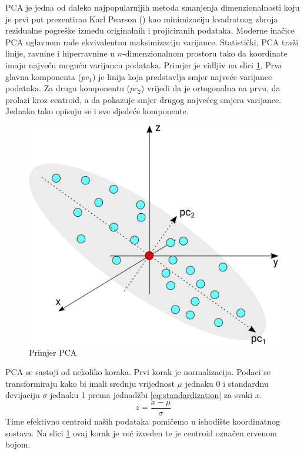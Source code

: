 \documentclass[times, utf8, diplomski]{fer}
\begin{document}
PCA je jedna od daleko najpopularnijih metoda smanjenja dimenzionalnosti koju je prvi put prezentirao Karl Pearson (\citeyear{pearson1901liii}) kao minimizaciju kvadratnog zbroja rezidualne pogreške između originalnih i projiciranih podataka. Moderne inačice PCA uglavnom rade ekvivalentnu maksimizaciju varijance. Statistički, PCA traži linije, ravnine i hiperravnine u $n$-dimenzionalnom prostoru tako da koordinate imaju najveću moguću varijancu podataka. Primjer je vidljiv na slici \ref{fig:pca}. Prva glavna komponenta ($pc_1$) je linija koja predstavlja smjer najveće varijance podataka. Za drugu komponentu ($pc_2$) vrijedi da je ortogonalna na prvu, da prolazi kroz centroid, a da pokazuje smjer drugog najvećeg smjera varijance. Jednako tako opisuju se i sve sljedeće komponente.
\begin{figure}[htb]
    \centering
    \includegraphics{resources/images/reduction/pca.png}
    \caption{Primjer PCA}
    \label{fig:pca}
\end{figure}

PCA se sastoji od nekoliko koraka.
Prvi korak je normalizacija. Podaci se transformiraju kako bi imali srednju vrijednost $\mu$ jednaku 0 i standardnu devijaciju $\sigma$ jednaku 1 prema jednadžbi \ref{eq:standardization} za svaki \(x\).
\begin{equation}
    z = \frac{x - \mu}{\sigma}
    \label{eq:standardization}
\end{equation}
Time efektivno centroid naših podataka pomičemo u ishodište koordinatnog sustava. Na slici \ref{fig:pca} ovaj korak je već izveden te je centroid označen crvenom bojom.
\end{document}
